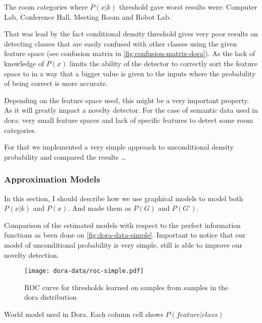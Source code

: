 \documentclass[a4paper]{article}
\begin{document}
The room categories where $P(x|k)$ threshold gave worst results were:
Computer Lab, Conference Hall, Meeting Room and Robot Lab.

That was lead by the fact conditional density threshold gives very poor results on detecting classes
that are easily confused with other classes using the given feature space (see confusion matrix in
\autoref{fig:confusion-matrix-dora}).
As the lack of knowledge of $P(x)$ limits the ability of the detector to correctly sort the feature
space to in a way that a bigger value is given to the inputs where the probability of being correct is more accurate.

Depending on the feature space used, this might be a very important property.
As it will greatly impact a novelty detector. For the case of semantic data used in dora:
very small feature spaces and lack of specific features to detect some room categories.

For that we implemented a very simple approach to unconditional density probability and compared the results
\dots



\subsubsection{Approximation Models}

In this section, I should describe how we use graphical models to model both $P(x|k)$ and $P(x)$.
And made them as $P(G)$ and $P(G')$.

Comparison of the estimated models with respect to the perfect information functions as been done on
\autoref{fig:dora-data-simple}.
Important to notice that our model of unconditional probability is very simple, still is able to improve
our novelty detection.



\begin{figure}[h]
\centering
\texttt{[image: dora-data/roc-simple.pdf]}
\caption{ROC curve for thresholds learned on samples from samples in the dora distribution}
\label{fig:dora-data-simple}
\end{figure}




\begin{sidewaystable}[h]
\begin{center}
\scalebox{0.50}{}
\end{center}
\caption{\label{tab:dora-world-distribution}World model used in Dora. Each column cell shows $P(feature|class)$}
\end{sidewaystable}
\end{document}

